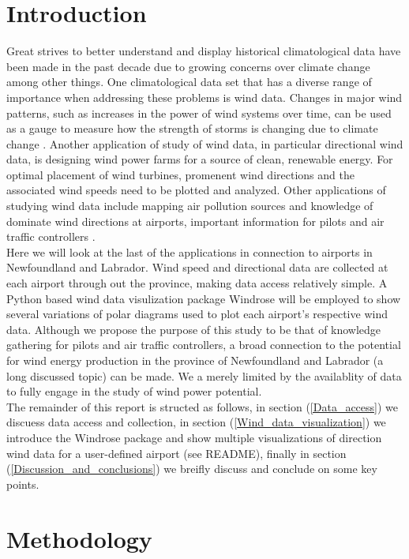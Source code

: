 \documentclass{article}
\begin{document}
\section{Introduction}\label{Introduction}
Great strives to better understand and display historical climatological data have been made in the past decade due to growing concerns over climate change among other things. One climatological data set 
that has a diverse range of importance when addressing these problems is wind data. Changes in major wind patterns, such as increases in the power of wind systems over time, can be used as a gauge to 
measure how the strength of storms is changing due to climate change \cite{Mendelsohn2012}. Another application of study of wind data, in particular directional wind data, is designing wind power 
farms \cite{CETINAY201751} for a source of clean, renewable energy. For optimal placement of wind turbines, promenent wind directions and the associated wind speeds need to be plotted and 
analyzed. Other applications of studying wind data include mapping air pollution sources \cite{ADAMS2016133} and knowledge of dominate wind directions at airports, important information for 
pilots and air traffic controllers \cite{jairm26}.
\\
\indent Here we will look at the last of the applications in connection to airports in Newfoundland and Labrador. Wind speed and directional data are collected at each airport through out the province, 
making data access relatively simple. A Python based wind data visulization package Windrose \cite{Roubeyrie2018} will be employed to show several variations of polar diagrams used to plot each 
airport's respective wind data. Although we propose the purpose of this study to be that of knowledge gathering for pilots and air traffic controllers, a broad connection to the potential for wind 
energy production in the province of Newfoundland and Labrador (a long discussed topic) can be made. We a merely limited by the availablity of data to fully engage in the study of wind power potential. 
\\
\indent The remainder of this report is structed as follows, in section (\ref{Data_access}) we discuess data access and collection, in section (\ref{Wind_data_visualization}) we introduce the Windrose  
package and show multiple visualizations of direction wind data for a user-defined airport (see README), finally in section (\ref{Discussion_and_conclusions}) we breifly discuss and conclude on some key 
points.      

\section{Methodology}\label{Methodology}
\end{document}
